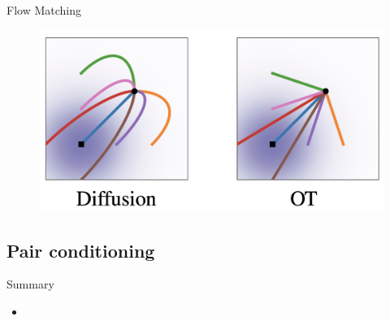 \begin{frame}{Flow Matching}
	\begin{figure}
		\centering
		\includegraphics[width=\linewidth]{figs/trajectories}
	\end{figure}
\end{frame}
\subsection{Pair conditioning}
\begin{frame}{Summary}
	\begin{itemize}
		\item
	\end{itemize}
\end{frame}
 